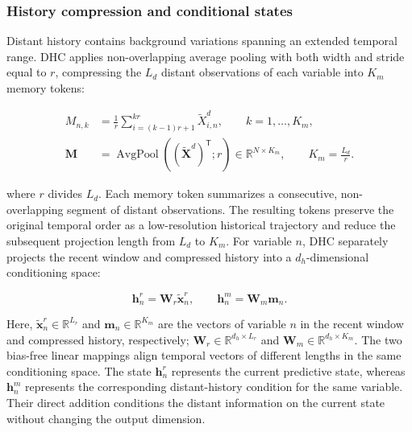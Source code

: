 \subsubsection{History compression and conditional states}

Distant history contains background variations spanning an extended temporal range. DHC applies non-overlapping average pooling with both width and stride equal to \(r\), compressing the \(L_d\) distant observations of each variable into \(K_m\) memory tokens:

\begin{equation}
\begin{aligned}
M_{n,k}
&=\frac{1}{r}\sum_{i=(k-1)r+1}^{kr}\widetilde X^d_{i,n},
\qquad k=1,\ldots,K_m,\\
\mathbf{M}
&=\operatorname{AvgPool}
\!\left((\widetilde{\mathbf{X}}^{d})^{\mathsf T};r\right)
\in\mathbb{R}^{N\times K_m},
\qquad K_m=\frac{L_d}{r}.
\end{aligned}
\label{eq:history-pooling}
\end{equation}

where \(r\) divides \(L_d\). Each memory token summarizes a consecutive, non-overlapping segment of distant observations. The resulting tokens preserve the original temporal order as a low-resolution historical trajectory and reduce the subsequent projection length from \(L_d\) to \(K_m\). For variable \(n\), DHC separately projects the recent window and compressed history into a \(d_h\)-dimensional conditioning space:

\begin{equation}
\mathbf{h}^{r}_{n}=\mathbf{W}_{r}\widetilde{\mathbf{x}}^{r}_{n},
\qquad
\mathbf{h}^{m}_{n}=\mathbf{W}_{m}\mathbf{m}_{n}.
\label{eq:dhc-states}
\end{equation}

Here, \(\widetilde{\mathbf{x}}^{r}_{n}\in\mathbb{R}^{L_r}\) and \(\mathbf{m}_{n}\in\mathbb{R}^{K_m}\) are the vectors of variable \(n\) in the recent window and compressed history, respectively; \(\mathbf{W}_{r}\in\mathbb{R}^{d_h\times L_r}\) and \(\mathbf{W}_{m}\in\mathbb{R}^{d_h\times K_m}\). The two bias-free linear mappings align temporal vectors of different lengths in the same conditioning space. The state \(\mathbf{h}^{r}_{n}\) represents the current predictive state, whereas \(\mathbf{h}^{m}_{n}\) represents the corresponding distant-history condition for the same variable. Their direct addition conditions the distant information on the current state without changing the output dimension.

